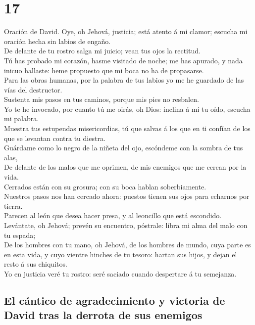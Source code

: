 \hypertarget{section-16}{%
\section{17}\label{section-16}}

 Oración de David. Oye, oh Jehová, justicia; está atento á
mi clamor; escucha mi oración hecha sin labios de engaño.\\
 De delante de tu rostro salga mi juicio; vean tus ojos la
rectitud.\\
 Tú has probado mi corazón, hasme visitado de noche; me
has apurado, y nada inicuo hallaste: heme propuesto que mi boca no ha de
propasarse.\\
 Para las obras humanas, por la palabra de tus labios yo
me he guardado de las vías del destructor.\\
 Sustenta mis pasos en tus caminos, porque mis pies no
resbalen.\\
 Yo te he invocado, por cuanto tú me oirás, oh Dios:
inclina á mí tu oído, escucha mi palabra.\\
 Muestra tus estupendas misericordias, tú que salvas á los
que en ti confían de los que se levantan contra tu diestra.\\
 Guárdame como lo negro de la niñeta del ojo, escóndeme
con la sombra de tus alas,\\
 De delante de los malos que me oprimen, de mis enemigos
que me cercan por la vida.\\
 Cerrados están con su grosura; con su boca hablan
soberbiamente.\\
 Nuestros pasos nos han cercado ahora: puestos tienen sus
ojos para echarnos por tierra.\\
 Parecen al león que desea hacer presa, y al leoncillo
que está escondido.\\
 Levántate, oh Jehová; prevén su encuentro, póstrale:
libra mi alma del malo con tu espada;\\
 De los hombres con tu mano, oh Jehová, de los hombres de
mundo, cuya parte es en esta vida, y cuyo vientre hinches de tu tesoro:
hartan sus hijos, y dejan el resto á sus chiquitos.\\
 Yo en justicia veré tu rostro: seré saciado cuando
despertare á tu semejanza.

\hypertarget{el-cuxe1ntico-de-agradecimiento-y-victoria-de-david-tras-la-derrota-de-sus-enemigos}{%
\subsection{El cántico de agradecimiento y victoria de David tras la
derrota de sus
enemigos}\label{el-cuxe1ntico-de-agradecimiento-y-victoria-de-david-tras-la-derrota-de-sus-enemigos}}


